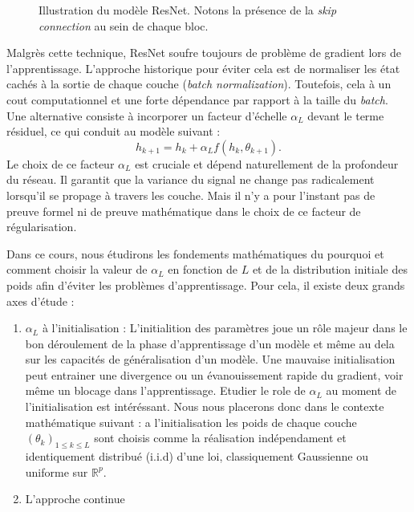\documentclass{report}
\theoremstyle{plain}%
\theoremstyle{definition}
\theoremstyle{remark}
\begin{document}
\begin{figure}[htbp]
    \centering
    \caption{Illustration du modèle ResNet. Notons la présence de la \textit{skip connection} au sein de chaque bloc.}
    \label{fig:resnet}
\end{figure}

Malgrès cette technique, ResNet soufre toujours de problème de gradient lors de l'apprentissage. L'approche historique pour éviter cela est de normaliser les état cachés à la sortie de chaque couche (\textit{batch normalization}). Toutefois, cela à un cout computationnel et une forte dépendance par rapport à la taille du \textit{batch}. Une alternative consiste à incorporer un facteur d'échelle $ \alpha _L $ devant le terme résiduel, ce qui conduit au modèle suivant : 
\[
    h_{k+1} = h_k + \alpha_L f(h_k, \theta_{k+1})
.\]
Le choix de ce facteur $ \alpha _L $ est cruciale et dépend naturellement de la profondeur du réseau. Il garantit que la variance du signal ne change pas radicalement lorsqu'il se propage à travers les couche. Mais il n'y a pour l'instant pas de preuve formel ni de preuve mathématique dans le choix de ce facteur de régularisation.


Dans ce cours, nous étudirons les fondements mathématiques du pourquoi et comment choisir la valeur de $ \alpha _L $ en fonction de $ L $  et de la distribution initiale des poids afin d'éviter les problèmes d'apprentissage. Pour cela, il existe deux grands axes d'étude :
\begin{enumerate}
    \item $ \alpha _L  $ à l'initialisation : L'initialition des paramètres joue un rôle majeur dans le bon déroulement de la phase d'apprentissage d'un modèle et même au dela sur les capacités de généralisation d'un modèle. Une mauvaise initialisation peut entrainer une divergence ou un évanouissement rapide du gradient, voir même un blocage dans l'apprentissage. Etudier le role de $ \alpha _L  $ au moment de l'initialisation est intéréssant. Nous nous placerons donc dans le contexte mathématique suivant : a l'initialisation les poids de chaque couche $ (\theta _k)_{1 \leq k \leq L} $ sont choisis comme la réalisation indépendament et identiquement distribué (i.i.d) d'une loi, classiquement Gaussienne ou uniforme sur $ \mathbb{R}^p $.
    \item L'approche continue 
\end{enumerate}
\end{document}
